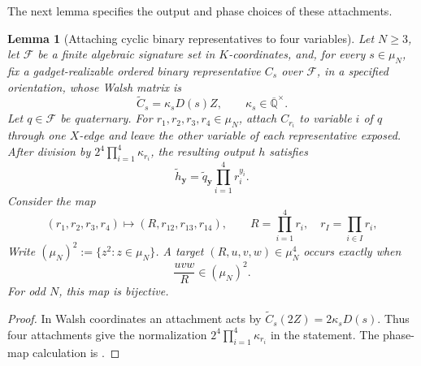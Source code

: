 \documentclass[11pt,letterpaper,onecolumn]{article}
\theoremstyle{plain}
\newtheorem{lemma}[lemma]{Lemma}
\theoremstyle{definition}
\theoremstyle{remark}
\newcommand{\AlgNums}{\overline{\mathbb Q}}
\newcommand{\cF}{\mathcal F}
\begin{document}
	The next lemma specifies the output and phase choices of these attachments.

\begin{lemma}[Attaching cyclic binary representatives to four variables]
		\label{lem:odd-cyc-four-port-dressing}
		Let \(N\ge3\), let \(\cF\) be a finite algebraic signature set in
		\(K\)-coordinates, and, for every \(s\in\mu_N\), fix a gadget-realizable ordered binary representative \(C_s\) over \(\cF\), in a specified orientation,
		whose Walsh matrix is
		\[
		\widetilde C_s=\kappa_sD(s)Z,
		\qquad \kappa_s\in\AlgNums^\times.
		\]
		Let \(q\in\cF\) be quaternary.
		For \(r_1,r_2,r_3,r_4\in\mu_N\), attach \(C_{r_i}\) to variable \(i\) of
		\(q\) through one \(X\)-edge and leave the other variable of each
		representative exposed.  After division by
		\(2^4\prod_{i=1}^4\kappa_{r_i}\), the resulting output \(h\) satisfies
		\begin{equation*}
			\widetilde h_{\mathbf y}
			=\widetilde q_{\mathbf y}\prod_{i=1}^4r_i^{y_i}.
		\end{equation*}
		Consider the map
		\begin{equation*}
			(r_1,r_2,r_3,r_4)
			\longmapsto
			(R,r_{12},r_{13},r_{14}),
			\qquad
			R=\prod_{i=1}^4r_i,
			\quad r_I=\prod_{i\in I}r_i,
		\end{equation*}
		Write \((\mu_N)^2:=\{z^2:z\in\mu_N\}\).  A target
		\((R,u,v,w)\in\mu_N^4\) occurs exactly when
		\begin{equation}
			\frac{uvw}{R}\in(\mu_N)^2.
			\label{eq:cyclic-dressing-image}
		\end{equation}
		For odd \(N\), this map is bijective.
	\end{lemma}
	
    \begin{proof}
        In Walsh coordinates an attachment acts by
        \(\widetilde C_s(2Z)=2\kappa_sD(s)\). Thus four attachments give
        the normalization \(2^4\prod_{i=1}^4\kappa_{r_i}\) in the statement.
        The phase-map calculation is \cite[Lemma~7.3]{Liu2026DEQ2Holant}.
	\end{proof}
	
\end{document}
